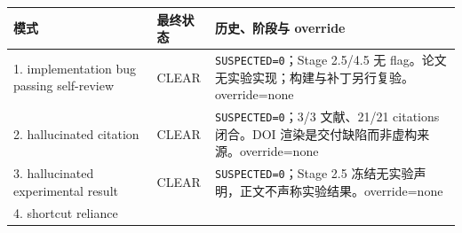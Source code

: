 \documentclass[12pt,a4paper]{article}
\begin{document}
\begin{longtable}[]{@{}lll@{}}
\toprule
\begin{minipage}[b]{0.30\columnwidth}\raggedright
模式\strut
\end{minipage} & \begin{minipage}[b]{0.30\columnwidth}\raggedright
最终状态\strut
\end{minipage} & \begin{minipage}[b]{0.30\columnwidth}\raggedright
历史、阶段与 override\strut
\end{minipage}\tabularnewline
\midrule
\endhead
\begin{minipage}[t]{0.30\columnwidth}\raggedright
1. implementation bug passing self-review\strut
\end{minipage} & \begin{minipage}[t]{0.30\columnwidth}\raggedright
CLEAR\strut
\end{minipage} & \begin{minipage}[t]{0.30\columnwidth}\raggedright
\texttt{SUSPECTED=0}；Stage 2.5/4.5 无
flag。论文无实验实现；构建与补丁另行复验。override=none\strut
\end{minipage}\tabularnewline
\begin{minipage}[t]{0.30\columnwidth}\raggedright
2. hallucinated citation\strut
\end{minipage} & \begin{minipage}[t]{0.30\columnwidth}\raggedright
CLEAR\strut
\end{minipage} & \begin{minipage}[t]{0.30\columnwidth}\raggedright
\texttt{SUSPECTED=0}；3/3 文献、21/21 citations 闭合。DOI
渲染是交付缺陷而非虚构来源。override=none\strut
\end{minipage}\tabularnewline
\begin{minipage}[t]{0.30\columnwidth}\raggedright
3. hallucinated experimental result\strut
\end{minipage} & \begin{minipage}[t]{0.30\columnwidth}\raggedright
CLEAR\strut
\end{minipage} & \begin{minipage}[t]{0.30\columnwidth}\raggedright
\texttt{SUSPECTED=0}；Stage 2.5
冻结无实验声明，正文不声称实验结果。override=none\strut
\end{minipage}\tabularnewline
\begin{minipage}[t]{0.30\columnwidth}\raggedright
4. shortcut reliance\strut
\end{minipage} & \begin{minipage}[t]{0.30\columnwidth}\raggedright

\end{minipage}
\end{longtable}
\end{document}
